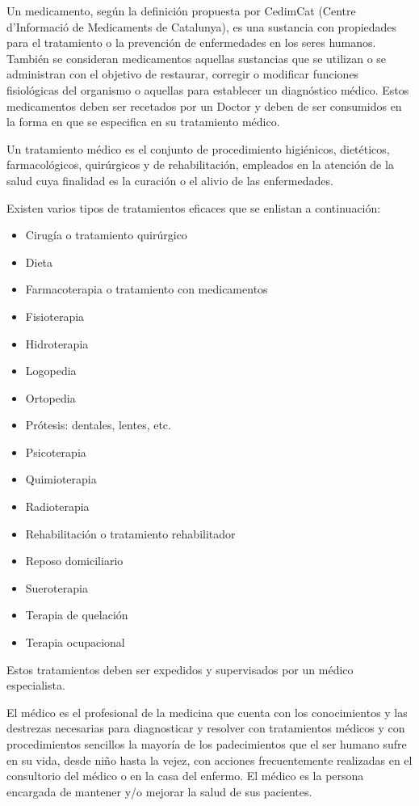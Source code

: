 Un medicamento, según la definición propuesta por CedimCat (Centre d'Informació de Medicaments de Catalunya)\cite{Referencia1}, es una sustancia con propiedades para el tratamiento o la prevención de enfermedades en los seres humanos. También se consideran medicamentos aquellas sustancias que se utilizan o se administran con el objetivo de restaurar, corregir o modificar funciones fisiológicas del organismo o aquellas para establecer un diagnóstico médico. Estos medicamentos deben ser recetados por un Doctor y deben de ser consumidos en la forma en que se especifica en su tratamiento médico.

Un tratamiento médico es el conjunto de procedimiento higiénicos, dietéticos, farmacológicos, quirúrgicos y de rehabilitación, empleados en la atención de la salud\cite{Referencia2} cuya finalidad es la curación o el alivio de las enfermedades.

Existen varios tipos de tratamientos eficaces que se enlistan a continuación\cite{Referencia3}:
\begin{itemize}
	\item Cirugía o tratamiento quirúrgico
	\item Dieta
	\item Farmacoterapia o tratamiento con medicamentos
	\item Fisioterapia
	\item Hidroterapia
	\item Logopedia
	\item Ortopedia
	\item Prótesis: dentales, lentes, etc.
	\item Psicoterapia
	\item Quimioterapia
	\item Radioterapia
	\item Rehabilitación o tratamiento rehabilitador
	\item Reposo domiciliario
	\item Sueroterapia
	\item Terapia de quelación
	\item Terapia ocupacional
\end{itemize}

Estos tratamientos deben ser expedidos y supervisados por un médico especialista.

El médico es el profesional de la medicina que cuenta con los conocimientos y las destrezas necesarias para diagnosticar y resolver con tratamientos médicos y con procedimientos sencillos la mayoría de los padecimientos que el ser humano sufre en su vida, desde niño hasta la vejez, con acciones frecuentemente realizadas en el consultorio del médico o en la casa del enfermo\cite{Referencia4}. El médico es la persona encargada de mantener y/o mejorar la salud de sus pacientes.

